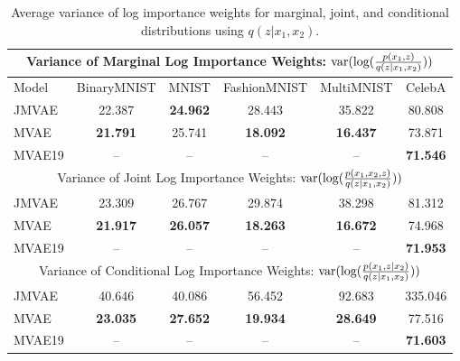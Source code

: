 \begin{table}[h!]
\centering
\small
\begin{tabular}{ l|c|c|c|c|c }
    \toprule
    \multicolumn{6}{c}{Variance of Marginal Log Importance Weights: $\textup{var}(\textup{log}(\frac{p(x_1,z)}{q(z|x_1,x_2)}))$} \\
    \hline
    Model & BinaryMNIST & MNIST & FashionMNIST & MultiMNIST & CelebA \\
    \hline
    JMVAE & 22.387 & \textbf{24.962} & 28.443 & 35.822 & 80.808 \\
    MVAE & \textbf{21.791} & 25.741 & \textbf{18.092} & \textbf{16.437} & 73.871 \\
    MVAE19 & -- & -- & -- & -- & \textbf{71.546} \\
    \hline
    \multicolumn{6}{c}{Variance of Joint Log Importance Weights: $\textup{var}(\textup{log}(\frac{p(x_1,x_2,z)}{q(z|x_1,x_2)}))$} \\
    \hline
    JMVAE & 23.309 & 26.767 & 29.874 & 38.298 & 81.312 \\
    MVAE & \textbf{21.917} & \textbf{26.057} & \textbf{18.263} & \textbf{16.672} & 74.968 \\
    MVAE19 & -- & -- & -- & -- & \textbf{71.953} \\
    \hline
    \multicolumn{6}{c}{Variance of Conditional Log Importance Weights: $\textup{var}(\textup{log}(\frac{p(x_1,z|x_2)}{q(z|x_1,x_2)}))$} \\
    \hline
    JMVAE & 40.646 & 40.086 & 56.452 & 92.683 & 335.046 \\
    MVAE & \textbf{23.035} & \textbf{27.652} & \textbf{19.934} & \textbf{28.649} & 77.516 \\
    MVAE19 & -- & -- & -- & -- & \textbf{71.603} \\
    \bottomrule
\end{tabular}
\caption{Average variance of log importance weights for marginal, joint, and conditional distributions using $q(z|x_1,x_2)$.}
\label{table:xy_variances}
\end{table}


